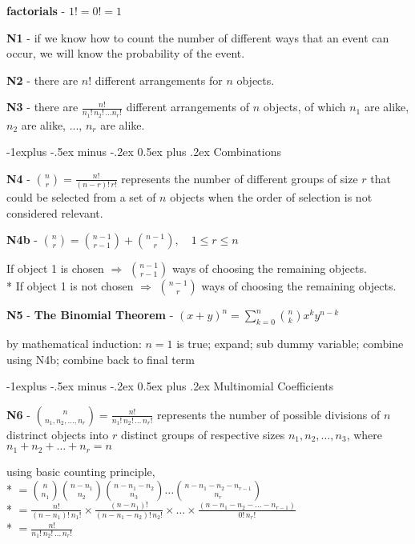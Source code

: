 \documentclass[10pt, landscape]{article}
\makeatletter
\renewcommand{\subsection}{\@startsection{subsection}{2}{0mm}%
  {-1explus -.5ex minus -.2ex}%
  {0.5ex plus .2ex}%
{\normalfont\normalsize\bfseries}}
\makeatother
\begin{document}
\begin{multicols*}{3}
  \textbf{factorials} - $1! = 0! = 1$

  \textbf{N1} - if we know how to count the number of different ways that an event can occur, we will know the probability of the event.

  \textbf{N2} - there are $n!$ different arrangements for $n$ objects.

  \textbf{N3} - there are $\frac{n!}{n_1!\, n_2!\, \dots n_r!}$ different arrangements of $n$ objects, 
  of which $n_1$ are alike, $n_2$ are alike, ..., $n_r$ are alike.

  \subsection{Combinations}

  \textbf{N4} - $\binom{n}{r} = \frac{n!}{(n-r)!\,r!}$ represents the number of different groups of size $r$ that could be selected from a set of $n$ objects when the order of selection is not considered relevant.

  \textbf{N4b} - $\binom{n}{r} = \binom{n-1}{r-1} + \binom{n-1}{r}, \quad 1 \leq r \leq n$
  \begin{niceproof}
    If object 1 is chosen $\Rightarrow$ $\binom{n-1}{r-1}$ ways of choosing the remaining objects.
    \\* If object 1 is not chosen $\Rightarrow$ $\binom{n-1}{r}$ ways of choosing the remaining objects.
  \end{niceproof}

  \textbf{N5} - \textbf{The Binomial Theorem} - \( {\displaystyle{(x+y)^n = \sum^n_{k=0} \binom{n}{k} x^k y^{n-k} }} \) 
  \begin{niceproof}
    by mathematical induction: $n=1$ is true; expand; sub dummy variable; combine using N4b; combine back to final term
  \end{niceproof}

  \subsection{Multinomial Coefficients}

  \textbf{N6} - $\binom{n}{n_1, n_2, \dots, n_r} = \frac{n!}{n_1!\, n_2!\, \dots \, n_r!}$  
  represents the number of possible divisions of $n$ distrinct objects 
  into $r$ distinct groups of respective sizes $n_1, n_2, \dots, n_3$, 
  where $n_1 + n_2 + \dots + n_r = n$
  \begin{niceproof}
    using basic counting principle, 
    \\* $= \binom{n}{n_1} \binom{n-n_1}{n_2} \binom{n-n_1-n_2}{n_3} \dots \binom{n-n_1-n_2-n_{r-1}}{n_r}$
    \\* $= \frac{n!}{(n-n_1)!\,n_1!} \times \frac{(n-n_1)!}{(n-n_1-n_2)!\, n_2!} \times \dots \times \frac{( n-n_1-n_2-\dots -n_{r-1} )}{0!\, n_r!}$
    \\* $= \frac{n!}{n_1!\, n_2! \, \dots \, n_r!}$
  \end{niceproof}


\end{multicols*}
\end{document}
